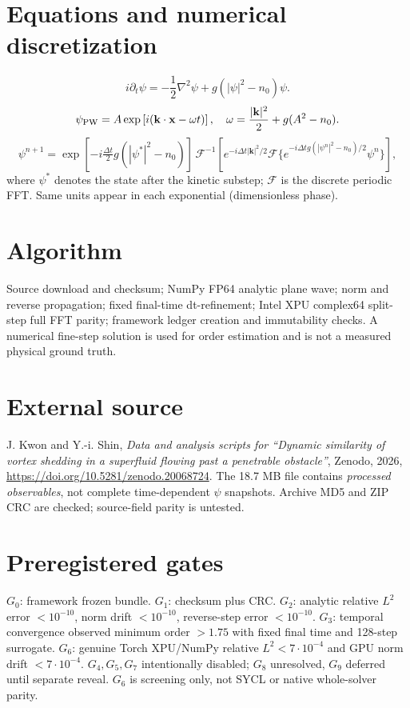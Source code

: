 \documentclass[11pt,a4paper]{article}
\begin{document}
\section{Equations and numerical discretization}
\begin{equation}i\partial_t\psi=-\frac12\nabla^2\psi+g(|\psi|^2-n_0)\psi.\end{equation}
\begin{equation}\psi_{\rm PW}=A\exp\left[i(\mathbf{k}\cdot\mathbf{x}-\omega t)\right],\quad \omega=\frac{|\mathbf{k}|^2}{2}+g(A^2-n_0).\end{equation}
\begin{equation}\psi^{n+1}=\exp[-i\tfrac{\Delta t}{2}g(|\psi^{*}|^2-n_0)]\,\mathcal F^{-1}[e^{-i\Delta t |\mathbf{k}|^2/2}\mathcal F\{e^{-i\Delta t g(|\psi^{n}|^2-n_0)/2}\psi^n\}],\end{equation}
where $\psi^*$ denotes the state after the kinetic substep; $\mathcal F$ is the discrete periodic FFT. Same units appear in each exponential (dimensionless phase).
\section{Algorithm}
Source download and checksum; NumPy FP64 analytic plane wave; norm and reverse propagation; fixed final-time dt-refinement; Intel XPU complex64 split-step full FFT parity; framework ledger creation and immutability checks. A numerical fine-step solution is used for order estimation and is not a measured physical ground truth.
\section{External source}
J. Kwon and Y.-i. Shin, \emph{Data and analysis scripts for ``Dynamic similarity of vortex shedding in a superfluid flowing past a penetrable obstacle''}, Zenodo, 2026, \url{https://doi.org/10.5281/zenodo.20068724}. The 18.7 MB file contains \emph{processed observables}, not complete time-dependent $\psi$ snapshots. Archive MD5 and ZIP CRC are checked; source-field parity is untested.
\section{Preregistered gates}
$G_0$: framework frozen bundle. $G_1$: checksum plus CRC. $G_2$: analytic relative $L^2$ error $<10^{-10}$, norm drift $<10^{-10}$, reverse-step error $<10^{-10}$. $G_3$: temporal convergence observed minimum order $>1.75$ with fixed final time and 128-step surrogate. $G_6$: genuine Torch XPU/NumPy relative $L^2<7\cdot10^{-4}$ and GPU norm drift $<7\cdot10^{-4}$. $G_4,G_5,G_7$ intentionally disabled; $G_8$ unresolved, $G_9$ deferred until separate reveal. $G_6$ is screening only, not SYCL or native whole-solver parity.
\end{document}
